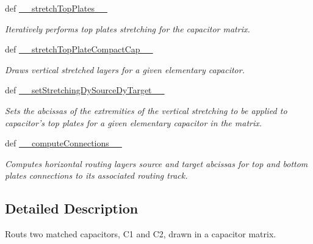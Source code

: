 \begin{DoxyCompactItemize}
def \hyperlink{classpython_1_1CapacitorRouted_1_1RoutMatchedCapacitor_a7d642764cf9e385710751eec3f43f7af}{\-\_\-\-\_\-stretch\-Top\-Plates\-\_\-\-\_\-}
\begin{DoxyCompactList}\small\item\em Iteratively performs top plates stretching for the capacitor matrix. \end{DoxyCompactList}\item 
def \hyperlink{classpython_1_1CapacitorRouted_1_1RoutMatchedCapacitor_a57eade928345587b01420a05be475a8f}{\-\_\-\-\_\-stretch\-Top\-Plate\-Compact\-Cap\-\_\-\-\_\-}
\begin{DoxyCompactList}\small\item\em Draws vertical stretched layers for a given elementary capacitor. \end{DoxyCompactList}\item 
def \hyperlink{classpython_1_1CapacitorRouted_1_1RoutMatchedCapacitor_a1077752f46c512f70377cc60bd772034}{\-\_\-\-\_\-set\-Stretching\-Dy\-Source\-Dy\-Target\-\_\-\-\_\-}
\begin{DoxyCompactList}\small\item\em Sets the abcissas of the extremities of the vertical stretching to be applied to capacitor's top plates for a given elementary capacitor in the matrix. \end{DoxyCompactList}\item 
def \hyperlink{classpython_1_1CapacitorRouted_1_1RoutMatchedCapacitor_aaaf2e610688441a439b8a3624e1393b9}{\-\_\-\-\_\-compute\-Connections\-\_\-\-\_\-}
\begin{DoxyCompactList}\small\item\em Computes horizontal routing layers source and target abcissas for top and bottom plates connections to its associated routing track. \end{DoxyCompactList}\end{DoxyCompactItemize}


\subsection{Detailed Description}
Routs two matched capacitors, C1 and C2, drawn in a capacitor matrix. 

